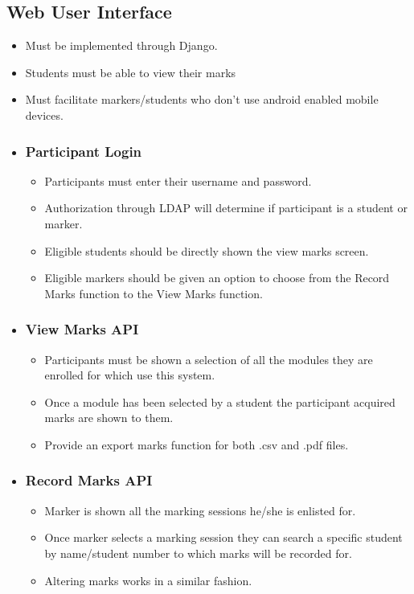 \documentclass[10pt,a4paper]{article}
\begin{document}
	\subsection*{Web User Interface}
	\begin{itemize}
		\item Must be implemented through Django.
  		\item Students must be able to view their marks
  		\item Must facilitate markers/students who don't use android enabled mobile devices.
  		
		\item \subsubsection*{Participant Login}
		\begin{itemize}
			\item Participants must enter their username and password.
			\item Authorization through LDAP will determine if participant is a student or marker. 
			\item Eligible students should be directly shown the view marks screen.
			\item Eligible markers should be given an option to choose from the Record Marks function to the View Marks function.
		\end{itemize}
		
		\item \subsubsection*{View Marks API}
		\begin{itemize}
			\item Participants must be shown a selection of all the modules they are enrolled for which use this system. 
			\item Once a module has been selected by a student the participant acquired marks are shown to them.
			\item Provide an export marks function for both .csv and .pdf files.
		\end{itemize}
		
		\item \subsubsection*{Record Marks API}
		\begin{itemize}
			\item Marker is shown all the marking sessions he/she is enlisted for.
			\item Once marker selects a marking session they can search a specific student by name/student number to which marks will be recorded for.
			\item Altering marks works in a similar fashion.
		\end{itemize}
	\end{itemize}
\end{document}

